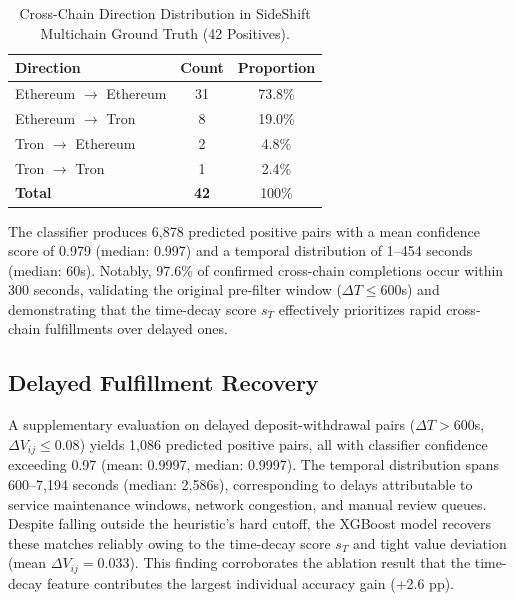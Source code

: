 \documentclass[journal]{IEEEtran}
\begin{document}
    \begin{table}[t]
    \centering
    \caption{Cross-Chain Direction Distribution in SideShift Multichain Ground Truth (42 Positives).}
    \label{tab:multichain_distribution}
    \begin{tabular}{lcc}
    \hline
    \textbf{Direction} & \textbf{Count} & \textbf{Proportion} \\
    \hline
    Ethereum $\rightarrow$ Ethereum & 31 & 73.8\% \\
    Ethereum $\rightarrow$ Tron     &  8 & 19.0\% \\
    Tron $\rightarrow$ Ethereum     &  2 &  4.8\% \\
    Tron $\rightarrow$ Tron         &  1 &  2.4\% \\
    \hline
    \textbf{Total}                  & \textbf{42} & 100\% \\
    \hline
    \end{tabular}
    \end{table}
    
    The classifier produces 6,878 predicted positive pairs with a mean confidence
    score of 0.979 (median: 0.997) and a temporal distribution of 1–454 seconds
    (median: 60s). Notably, 97.6\% of confirmed cross-chain completions occur
    within 300 seconds, validating the original pre-filter window ($\Delta T \leq 600$s)
    and demonstrating that the time-decay score $s_T$ effectively prioritizes
    rapid cross-chain fulfillments over delayed ones.
    
    \subsection{Delayed Fulfillment Recovery}
    
    A supplementary evaluation on delayed deposit-withdrawal pairs
    ($\Delta T > 600$s, $\Delta V_{ij} \leq 0.08$) yields 1,086 predicted
    positive pairs, all with classifier confidence exceeding 0.97 (mean:
    0.9997, median: 0.9997). The temporal distribution spans 600--7{,}194
    seconds (median: 2{,}586s), corresponding to delays attributable to
    service maintenance windows, network congestion, and manual review
    queues. Despite falling outside the heuristic's hard cutoff, the XGBoost
    model recovers these matches reliably owing to the time-decay score $s_T$
    and tight value deviation (mean $\Delta V_{ij} = 0.033$). This finding
    corroborates the ablation result that the time-decay feature contributes
    the largest individual accuracy gain (+2.6 pp).
    
\end{document}
